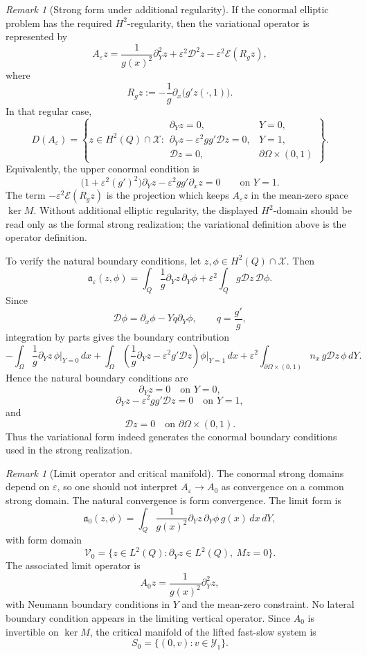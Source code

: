 \documentclass[11pt]{article}
\theoremstyle{definition}
\theoremstyle{remark}
\newtheorem{remark}[theorem]{Remark}
\numberwithin{equation}{section}
\begin{document}
\begin{remark}[Strong form under additional regularity]
\label{rem:strong-form-fast-operator}
If the conormal elliptic problem has the required \(H^2\)-regularity, then the
variational operator is represented by
\[
A_\varepsilon z
=
\frac1{g(x)^2}\partial_Y^2z
+
\varepsilon^2\mathcal D^2z
-
\varepsilon^2\mathcal E(R_gz),
\]
where
\[
R_gz:=-\frac1g\partial_x\bigl(g'z(\cdot,1)\bigr).
\]
In that regular case,
\[
D(A_\varepsilon)
=
\left\{
z\in H^2(Q)\cap \mathcal X:
\begin{array}{ll}
\partial_Yz=0, & Y=0,\\[1mm]
\partial_Yz-\varepsilon^2gg'\mathcal Dz=0, & Y=1,\\[1mm]
\mathcal Dz=0, & \partial\Omega\times(0,1)
\end{array}
\right\}.
\]
Equivalently, the upper conormal condition is
\[
\bigl(1+\varepsilon^2(g')^2\bigr)\partial_Yz
-
\varepsilon^2gg'\partial_xz
=
0
\qquad\text{on }Y=1.
\]
The term \(-\varepsilon^2\mathcal E(R_gz)\) is the projection which keeps
\(A_\varepsilon z\) in the mean-zero space \(\ker M\). Without additional
elliptic regularity, the displayed \(H^2\)-domain should be read only as the
formal strong realization; the variational definition above is the operator
definition.

To verify the natural boundary conditions, let \(z,\phi\in H^2(Q)\cap\mathcal X\).
Then
\[
\mathfrak a_\varepsilon(z,\phi)
=
\int_Q \frac1g\partial_Yz\,\partial_Y\phi
+
\varepsilon^2\int_Q g\mathcal Dz\,\mathcal D\phi .
\]
Since
\[
\mathcal D\phi=\partial_x\phi-Yq\partial_Y\phi,
\qquad q=\frac{g'}g,
\]
integration by parts gives the boundary contribution
\[
-\int_\Omega \frac1g\partial_Yz\,\phi\Big|_{Y=0}\,dx
+
\int_\Omega
\left(
\frac1g\partial_Yz-\varepsilon^2g'\mathcal Dz
\right)
\phi\Big|_{Y=1}\,dx
+
\varepsilon^2\int_{\partial\Omega\times(0,1)}
n_x\,g\mathcal Dz\,\phi\,dY .
\]
Hence the natural boundary conditions are
\[
\partial_Yz=0\quad\text{on }Y=0,
\]
\[
\partial_Yz-\varepsilon^2gg'\mathcal Dz=0\quad\text{on }Y=1,
\]
and
\[
\mathcal Dz=0\quad\text{on }\partial\Omega\times(0,1).
\]
Thus the variational form indeed generates the conormal boundary conditions
used in the strong realization.
\end{remark}

\begin{remark}[Limit operator and critical manifold]
The conormal strong domains depend on \(\varepsilon\), so one should not
interpret \(A_\varepsilon\to A_0\) as convergence on a common strong domain.
The natural convergence is form convergence. The limit form is
\[
\mathfrak a_0(z,\phi)
=
\int_Q \frac1{g(x)^2}\partial_Yz\,\partial_Y\phi\,g(x)\,dx\,dY,
\]
with form domain
\[
\mathcal V_0
=
\{z\in L^2(Q):\partial_Yz\in L^2(Q),\ Mz=0\}.
\]
The associated limit operator is
\[
A_0z=\frac1{g(x)^2}\partial_Y^2z,
\]
with Neumann boundary conditions in \(Y\) and the mean-zero constraint. No
lateral boundary condition appears in the limiting vertical operator. Since
\(A_0\) is invertible on \(\ker M\), the critical manifold of the lifted
fast-slow system is
\[
S_0=\{(0,v):v\in\mathcal Y_1\}.
\]
\end{remark}
\end{document}

